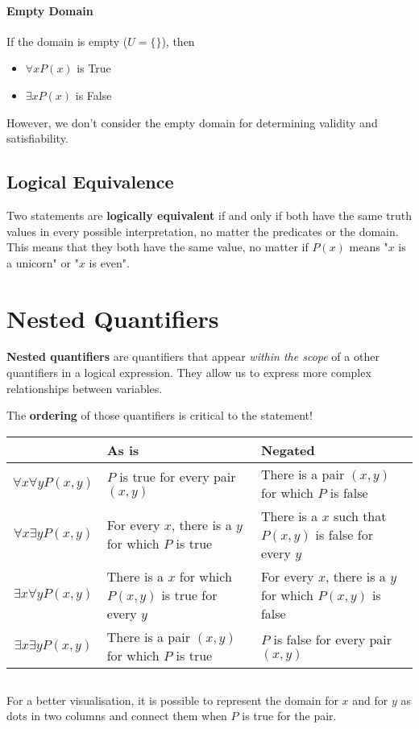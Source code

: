 \documentclass[10pt,a4paper]{book}
\begin{document}
\paragraph*{Empty Domain}
If the domain is empty ($U=\{\}$), then 
\begin{itemize}
\item $\forall xP(x)$ is True
\item $\exists xP(x)$ is False
\end{itemize}
However, we don't consider the empty domain for determining validity and satisfiability.
\subsection{Logical Equivalence}
Two statements are \textbf{logically equivalent} if and only if both have the same truth values in every possible interpretation, no matter the predicates or the domain. This means that they both have the same value, no matter if $P(x)$ means "$x$ is a unicorn" or "$x$ is even".
\section{Nested Quantifiers}
\textbf{Nested quantifiers} are quantifiers that appear \textit{within the scope} of a other quantifiers in a logical expression. They allow us to express more complex relationships between variables.\par 
The \textbf{ordering} of those quantifiers is critical to the statement!\\
$ $\\
\begin{tabularx}{\textwidth}{c |X |X }
 				 & As is & Negated\\
 \hline
 $\forall x\forall yP(x,y)$ & $P$ is true for every pair $(x,y)$ & There is a pair $(x,y)$ for which $P$ is false\\
 \hline 
 $\forall x\exists yP(x,y)$ & For every $x$, there is a $y$ for which $P$ is true & There is a $x$ such that $P(x,y)$ is false for every $y$\\
 \hline
 $\exists x\forall yP(x,y)$ & There is a $x$ for which $P(x,y)$ is true for every $y$ & For every $x$, there is a $y$ for which $P(x,y)$ is false\\
  \hline
  $\exists x\exists yP(x,y)$ & There is a pair $(x,y)$ for which $P$ is true & $P$ is false for every pair $(x,y)$\\
  \hline
\end{tabularx}
$ $\\
$ $\par
For a better visualisation, it is possible to represent the domain for $x$ and for $y$ as dots in two columns and connect them when $P$ is true for the pair.
\end{document}
